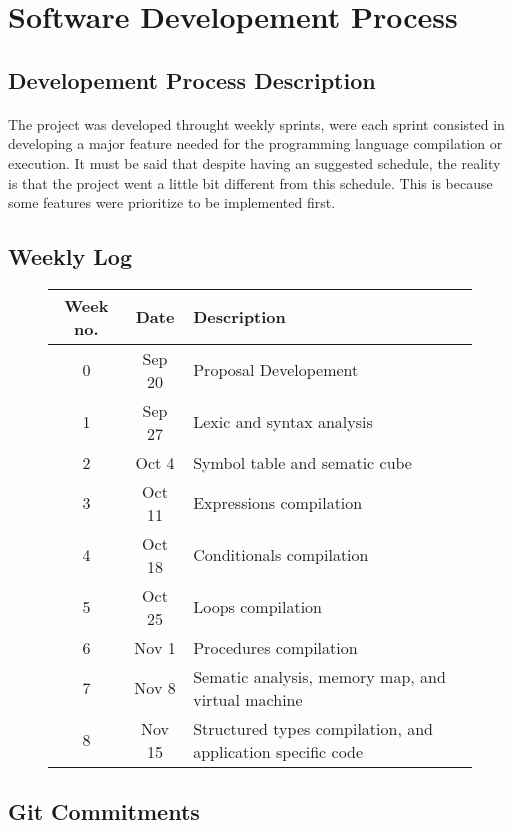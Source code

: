 \section{Software Developement Process}

\subsection{Developement Process Description}
\paragraph{} The project was developed throught weekly sprints, were each
sprint consisted in developing a major feature needed for the programming
language compilation or execution. It must be said that despite having an
suggested schedule, the reality is that the project went a little bit different
from this schedule. This is because some features were prioritize to be
implemented first.

\subsection{Weekly Log}

\begin{figure}[h]
    \centering
    \begin{tabular}{ccp{3in}}
        \toprule
        \textbf{Week no.} & \textbf{Date} & \textbf{Description}\\
        \midrule
        0 & Sep 20 & Proposal Developement\\
        1 & Sep 27 & Lexic and syntax analysis\\
        2 & Oct  4 & Symbol table and sematic cube\\
        3 & Oct 11 & Expressions compilation\\
        4 & Oct 18 & Conditionals compilation\\
        5 & Oct 25 & Loops compilation\\
        6 & Nov  1 & Procedures compilation\\
        7 & Nov  8 & Sematic analysis, memory map,
                     \newline and virtual machine\\
        8 & Nov 15 & Structured types compilation,
                     \newline and application specific code\\
        \bottomrule
    \end{tabular}
\end{figure}

\subsection{Git Commitments}

